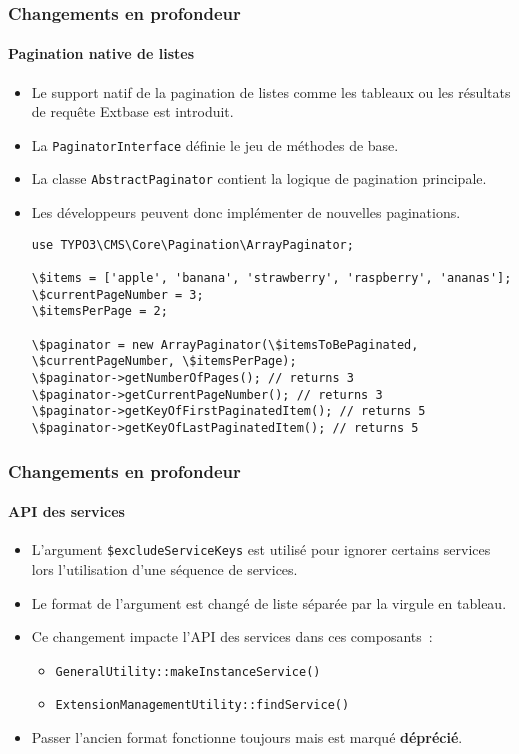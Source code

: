\begin{frame}[fragile]
	\frametitle{Changements en profondeur}
	\framesubtitle{Pagination native de listes}

	\lstset{basicstyle=\tiny\ttfamily}

	\begin{itemize}
		\item Le support natif de la pagination de listes comme les tableaux ou
			les résultats de requête Extbase est introduit.
		\item La \texttt{PaginatorInterface} définie le jeu de méthodes de base.
		\item La classe \texttt{AbstractPaginator} contient la logique de pagination principale.
		\item Les développeurs peuvent donc implémenter de nouvelles paginations.
\begin{lstlisting}
use TYPO3\CMS\Core\Pagination\ArrayPaginator;

\$items = ['apple', 'banana', 'strawberry', 'raspberry', 'ananas'];
\$currentPageNumber = 3;
\$itemsPerPage = 2;

\$paginator = new ArrayPaginator(\$itemsToBePaginated, \$currentPageNumber, \$itemsPerPage);
\$paginator->getNumberOfPages(); // returns 3
\$paginator->getCurrentPageNumber(); // returns 3
\$paginator->getKeyOfFirstPaginatedItem(); // returns 5
\$paginator->getKeyOfLastPaginatedItem(); // returns 5
\end{lstlisting}

	\end{itemize}

\end{frame}


\begin{frame}[fragile]
	\frametitle{Changements en profondeur}
	\framesubtitle{API des services}

	\begin{itemize}
		\item L'argument \texttt{\$excludeServiceKeys} est utilisé pour ignorer certains services lors l'utilisation
			d'une séquence de services.
		\item Le format de l'argument est changé de liste séparée par la virgule en tableau.
		\item Ce changement impacte l'API des services dans ces composants~:

			\begin{itemize}
				\item \texttt{GeneralUtility::makeInstanceService()}
				\item \texttt{ExtensionManagementUtility::findService()}
			\end{itemize}

		\item Passer l'ancien format fonctionne toujours mais est marqué \textbf{déprécié}.

	\end{itemize}

\end{frame}

